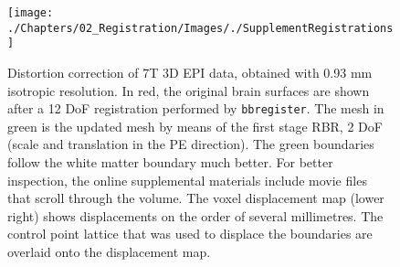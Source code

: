 \begin{figure}[!ht]
\centering
\texttt{[image: ./Chapters/02\_Registration/Images/./SupplementRegistrations]}
\caption{
	Distortion correction of 7T 3D EPI data, obtained with 0.93 mm isotropic resolution. In {\color{red}red}, the original brain surfaces are shown after a 12 DoF registration performed by \texttt{bbregister}. The mesh in {\color{green}green} is the updated mesh by means of the first stage RBR, 2 DoF (scale and translation in the PE direction). The green boundaries follow the white matter boundary much better. For better inspection, the online supplemental materials include movie files that scroll through the volume. The voxel displacement map (lower right) shows displacements on the order of several millimetres. The control point lattice that was used to displace the boundaries are overlaid onto the displacement map.} 
\label{fig:si-registrations}
\end{figure}